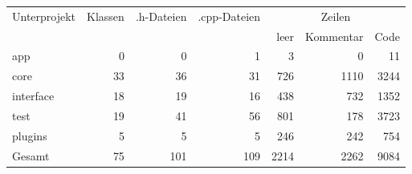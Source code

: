 \begin{tabular}{l|r|r|r|r|r|r}

Unterprojekt & Klassen & .h-Dateien & .cpp-Dateien & \multicolumn{3}{|c}{Zeilen} \\
 & & & & leer & Kommentar & Code \\
\hline
app			& 0		& 0		& 1		& 3		& 0 	& 11	\\
core		& 33	& 36	& 31 	& 726	& 1110	& 3244	\\
interface	& 18	& 19	& 16	& 438	& 732	& 1352	\\
test		& 19	& 41	& 56	& 801	& 178	& 3723	\\
plugins		& 5		& 5		& 5		& 246	& 242	& 754	\\
\hline
Gesamt 		& 75 	& 101  	& 109 	& 2214  & 2262  & 9084 	\\
\end{tabular}
